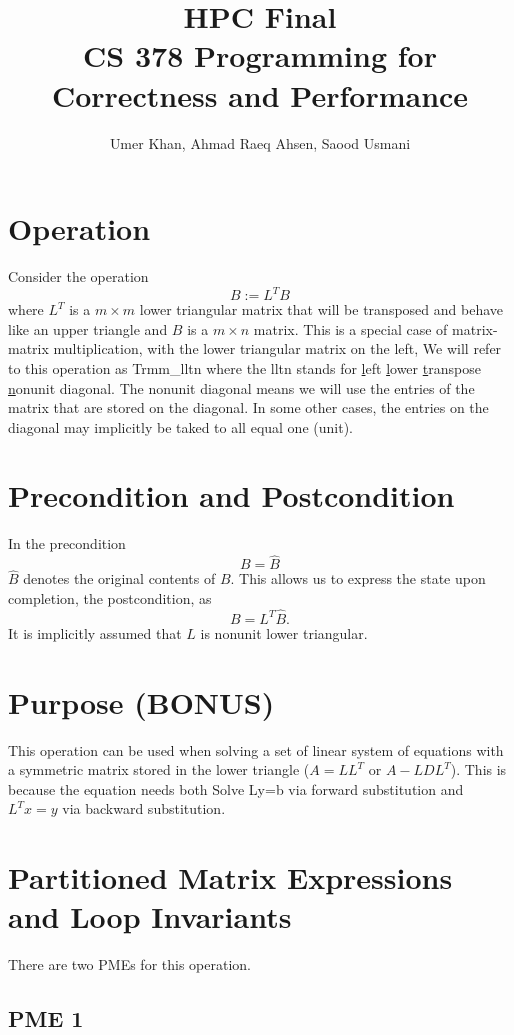 \documentclass[12pt]{article}
\title{HPC Final \\ CS 378 Programming for Correctness and Performance}
\author{Umer Khan, Ahmad Raeq Ahsen, Saood Usmani}
\begin{document}
	\maketitle

\section{Operation}

Consider the operation
\[
B := L^T B 
\]
where $ L^T $ is a $ m \times m $ lower triangular matrix that will be transposed and behave like an upper triangle and $ B $ is a $ m \times n $ matrix.
This is a special case of  
matrix-matrix multiplication, 
with the {\sc l}ower triangular matrix on the {\sc l}eft, 
We will refer to this operation
as {\sc Trmm\_lltn} where the {\sc lltn} stands for
\underline{l}eft
\underline{l}ower
\underline{t}ranspose
\underline{n}onunit diagonal.
The {\sc n}onunit diagonal means we will use the entries of the matrix that are stored on the diagonal.  In some other cases, the entries on the diagonal may implicitly be taked to all equal one ({\sc u}nit).

\section{Precondition and Postcondition}

In the precondition 
\[
B = \widehat B
\]
$ \widehat B $ denotes the original contents of $ B $.
This allows us to express the state upon completion, the postcondition, as
\[
B = L^T \widehat B.
\]
It is implicitly assumed that $ L $ is nonunit lower triangular.

\section{Purpose (BONUS)}
This operation can be used when solving a set of linear system of equations with a symmetric matrix stored in the lower triangle ($A = LL^T$ or $A - LDL^T$). This is because the equation needs both Solve Ly=b via forward substitution and $L^Tx = y$ via backward substitution.
\section{Partitioned Matrix Expressions and Loop Invariants}

There are two PMEs for this operation.

\subsection{PME 1}
\end{document}
